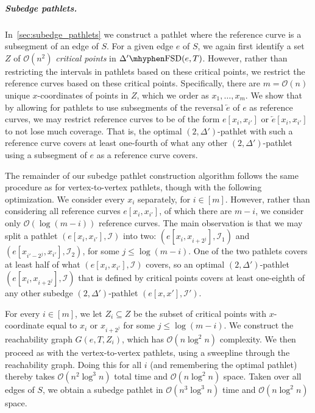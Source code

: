\documentclass[a4paper,UKenglish,cleveref,thm-restate,notab]{lipics-v2021}
\newcommand{\FSD}[1][\Delta'] {\ensuremath{#1}\mhyphen\mathrm{FSD}}
\newcommand{\bigO}{\mathcal{O}}
\newcommand{\I}{\mathcal{I}}
\newcommand{\rev}{\overleftarrow}
\begin{document}
            \subparagraph*{Subedge pathlets.} In~\cref{sec:subedge_pathlets} we construct a pathlet where the reference curve is a subsegment of an edge of $S$.
            For a given edge $e$ of $S$, we again first identify a set $Z$ of $\bigO(n^2)$ \emph{critical points} in $\FSD(e, T)$.
            However, rather than restricting the intervals in pathlets based on these critical points, we restrict the reference curves based on these critical points.
            Specifically, there are $m = \bigO(n)$ unique $x$-coordinates of points in $Z$, which we order as $x_1, \dots, x_m$.
            We show that by allowing for pathlets to use subsegments of the reversal $\rev{e}$ of $e$ as reference curves, we may restrict reference curves to be of the form $e[x_i, x_{i'}]$ or $\rev{e}[x_i, x_{i'}]$ to not lose much coverage.
            That is, the optimal $(2, \Delta')$-pathlet with such a reference curve covers at least one-fourth of what any other $(2, \Delta')$-pathlet using a subsegment of $e$ as a reference curve covers.

            The remainder of our subedge pathlet construction algorithm follows the same procedure as for vertex-to-vertex pathlets, though with the following optimization.
            We consider every $x_i$ separately, for $i \in [m]$.
            However, rather than considering all reference curves $e[x_i, x_{i'}]$, of which there are $m-i$, we consider only $\bigO(\log (m-i))$ reference curves.
            The main observation is that we may split a pathlet $(e[x_i, x_{i'}], \I)$ into two: $(e[x_i, x_{i+2^j}], \I_1)$ and $(e[x_{i'-2^j}, x_{i'}], \I_2)$, for some $j \leq \log (m-i)$.
            One of the two pathlets covers at least half of what $(e[x_i, x_{i'}], \I)$ covers, so an optimal $(2, \Delta')$-pathlet $(e[x_i, x_{i+2^j}], \I)$ that is defined by critical points covers at least one-eighth of any other subedge $(2, \Delta')$-pathlet $(e[x, x'], \I')$.

            For every $i \in [m]$, we let $Z_i \subseteq Z$ be the subset of critical points with $x$-coordinate equal to $x_i$ or $x_{i+2^j}$ for some $j \leq \log (m-i)$.
            We construct the reachability graph $G(e, T, Z_i)$, which has $\bigO(n \log^2 n)$ complexity.
            We then proceed as with the vertex-to-vertex pathlets, using a sweepline through the reachability graph.
            Doing this for all $i$ (and remembering the optimal pathlet) thereby takes $\bigO(n^2 \log^3 n)$ total time and $\bigO(n \log^2 n)$ space.
            Taken over all edges of $S$, we obtain a subedge pathlet in $\bigO(n^3 \log^3 n)$ time and $\bigO(n \log^2 n)$ space.
\end{document}
